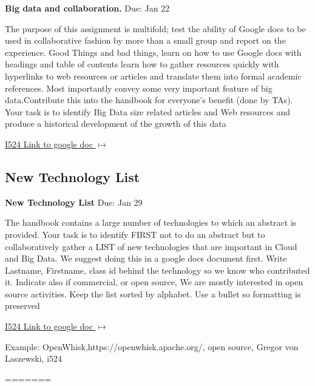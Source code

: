 \begin{exercise} \label{a:i524-big-data-and-collaboration}

{\bf Big data and collaboration.} Due: Jan 22

The purpose of this assignment is multifold; test the ability of Google docs to be used in collaborative fashion by more than a small group and report on the experience. Good Things and bad things, learn on how to use Google docs with headings and table of contents learn how to gather resources quickly with hyperlinks to web resources or articles and translate them into formal academic references. Most importantly convey some very important feature of big data.Contribute this into the handbook for everyone's benefit (done by TAs). Your task is to identify Big Data size related articles and Web resources and produce a historical development of the growth of this data

\smallskip

{\hfill \href{https://docs.google.com/document/d/1ZHNdhX_Jx7uBQo0kthSYQ6TQR8_KNbgOwH2EuqBQcjY/edit?usp=sharing}{I524 Link to google doc $\mapsto$}}

\end{exercise}

\subsection{New Technology List}

\begin{exercise} \label{a:i524-new-tech-list}
{\bf New Technology List} Due: Jan 29

The handbook contains a large number of technologies to which an abstract is provided. Your task is to identify FIRST not to do an abstract but to collaboratively gather a LIST of new technologies that are important in Cloud and Big Data. We suggest doing this in a google docs document first. Write Lastname, Firstname, class id behind the technology so we know who contributed it. Indicate also if commercial, or open source, We are mostly interested in open source activities. Keep the list sorted by alphabet. Use a bullet so formatting is preserved

{\hfill \href{https://docs.google.com/document/d/1LeHGHTSBbaPXYVor0efhmi5W7JJjS7EQHABHqgRAPuU/edit?usp=sharing}{I524 Link to google doc $\mapsto$}}

\smallskip
 
Example: OpenWhisk,https://openwhisk.apache.org/, open source, Gregor von Laszewski, i524
 
\end{exercise}
=======
